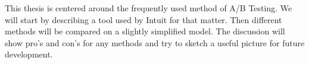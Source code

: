 \documentclass[main.tex]{subfiles}
\begin{document}
This thesis is centered around the frequently used method of A/B Testing. We will start by describing a tool used by Intuit for that matter. Then different methods will be compared on a slightly simplified model. The discussion will show pro's and con's for any methods and try to sketch a useful picture for future development.
\end{document}
